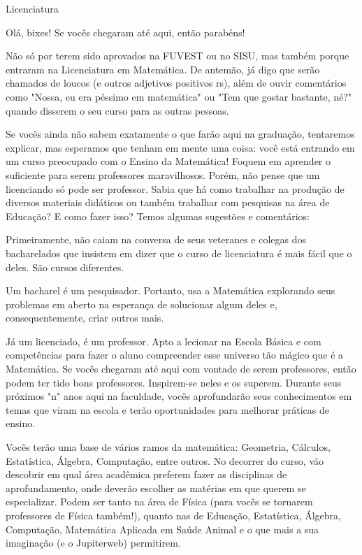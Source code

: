 \begin{subsecao}{Licenciatura}

Olá, bixes! Se vocês chegaram até aqui, então parabéns!

Não só por terem sido aprovados na FUVEST ou no SISU, mas também porque entraram
na Licenciatura em Matemática. De antemão, já digo que serão chamados de loucos (e outros
adjetivos positivos rs), além de ouvir comentários como "Nossa, eu era péssimo 
em matemática" ou "Tem que gostar bastante, né?" quando disserem o seu curso para as 
outras pessoas.

Se vocês ainda não sabem exatamente o que farão aqui na graduação, tentaremos
explicar, mas esperamos que tenham em mente uma coisa: você está entrando em um
curso preocupado com o Ensino da Matemática! Foquem em aprender o suficiente para 
serem professores maravilhosos. Porém, não pense que um licenciando só pode ser professor.
Sabia que há como trabalhar na produção de diversos materiais didáticos ou também trabalhar
com pesquisas na área de Educação? E como fazer isso?  Temos algumas sugestões e comentários:

Primeiramente, não caiam na conversa de seus veteranes e colegas dos bacharelados
que insistem em dizer que o curso de licenciatura é mais fácil que o deles. São
cursos diferentes.

Um bacharel é um pesquisador. Portanto, usa a Matemática explorando seus
problemas em aberto na esperança de solucionar algum deles e, consequentemente,
criar outros mais.

Já um licenciado, é um professor. Apto a lecionar na Escola Básica e com
competências para fazer o aluno compreender esse universo tão mágico que é a
Matemática. Se vocês chegaram até aqui com vontade de serem professores, então
podem ter tido bons professores. Inspirem-se neles e os superem. Durante seus 
próximos "n" anos aqui na faculdade, vocês aprofundarão seus conhecimentos em 
temas que viram na escola e terão oportunidades para melhorar práticas de ensino.
 

Vocês terão uma base de vários ramos da matemática: Geometria, Cálculos,
Estatística, Álgebra, Computação, entre outros. No decorrer do curso, vão
descobrir em qual área acadêmica preferem fazer as disciplinas de
aprofundamento, onde deverão escolher as matérias em que querem se especializar.
Podem ser tanto na área de Física (para vocês se tornarem professores de Física
também!), quanto nas de Educação, Estatística, Álgebra, Computação, Matemática
Aplicada em Saúde Animal e o que mais a sua imaginação (e o Jupiterweb) permitirem.


\end{subsecao}
